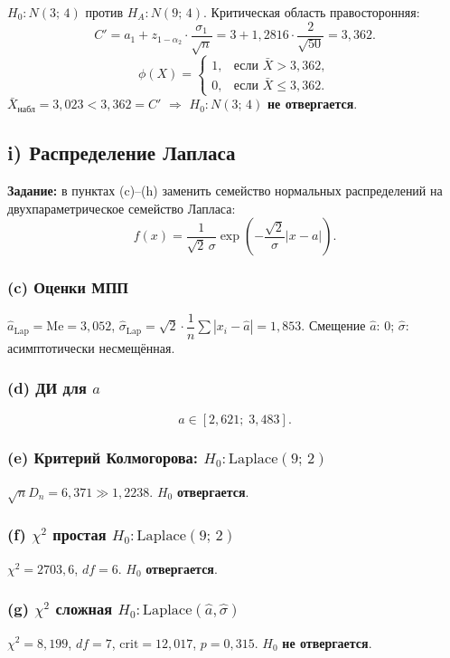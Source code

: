 \documentclass[12pt,a4paper]{article}
\begin{document}
	$H_0\colon N(3;\,4)$ против $H_A\colon N(9;\,4)$. Критическая область правосторонняя:
	\[
	C' = a_1 + z_{1-\alpha_2}\cdot\frac{\sigma_1}{\sqrt{n}}
	= 3 + 1{,}2816\cdot\frac{2}{\sqrt{50}} = 3{,}362.
	\]
	\[
	\phi(X) = \begin{cases}
		1, & \text{если } \bar{X} > 3{,}362,\\
		0, & \text{если } \bar{X} \le 3{,}362.
	\end{cases}
	\]
	$\bar{X}_{\text{набл}} = 3{,}023 < 3{,}362 = C'$ $\Rightarrow$ $H_0\colon N(3;\,4)$
	\textbf{не отвергается}.
	
	\subsection{i) Распределение Лапласа}
	
	\textbf{Задание:} в пунктах (c)--(h) заменить семейство нормальных распределений
	на двухпараметрическое семейство Лапласа:
	\[
	f(x) = \frac{1}{\sqrt{2}\,\sigma}\exp\!\left(-\frac{\sqrt{2}}{\sigma}|x-a|\right).
	\]
	
	\subsubsection*{(c) Оценки МПП}
	$\hat{a}_{\text{Lap}} = \mathrm{Me} = 3{,}052$,\;
	$\hat\sigma_{\text{Lap}} = \sqrt{2}\cdot\dfrac{1}{n}\sum|x_i-\hat{a}| = 1{,}853$.
	Смещение $\hat{a}$: $0$; $\hat\sigma$: асимптотически несмещённая.
	
	\subsubsection*{(d) ДИ для $a$}
	\[
	a \in [2{,}621;\; 3{,}483].
	\]
	
	\subsubsection*{(e) Критерий Колмогорова: $H_0\colon\mathrm{Laplace}(9;\,2)$}
	$\sqrt{n}D_n = 6{,}371 \gg 1{,}2238$. $H_0$ \textbf{отвергается}.
	
	\subsubsection*{(f) $\chi^2$ простая $H_0\colon\mathrm{Laplace}(9;\,2)$}
	$\chi^2 = 2703{,}6$, $df=6$. $H_0$ \textbf{отвергается}.
	
	\subsubsection*{(g) $\chi^2$ сложная $H_0\colon\mathrm{Laplace}(\hat{a},\hat\sigma)$}
	$\chi^2 = 8{,}199$, $df=7$, $\mathrm{crit}=12{,}017$, $p=0{,}315$.
	$H_0$ \textbf{не отвергается}.
	
\end{document}
